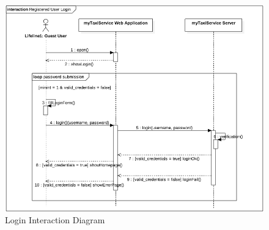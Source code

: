 				\begin{figure}[H]
					\centering
					\includegraphics[width=\textwidth, scale=0.5]{IMG/InteractionDiagrams/RegisteredUserLogin.png}
					\caption{Login Interaction Diagram}\label{sec:FigureLogin}
				\end{figure}